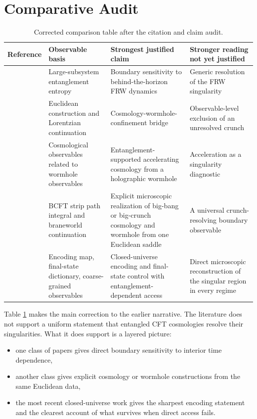 \documentclass[11pt]{article}
\begin{document}
\section{Comparative Audit}

\begin{table}[t]
\centering
\small
\setlength{\tabcolsep}{4pt}
\begin{tabular}{p{2.3cm}p{3.0cm}p{4.0cm}p{4.0cm}}
\toprule
Reference & Observable basis & Strongest justified claim & Stronger reading not yet justified \\
\midrule
\cite{Cooper:2018cmb} & Large-subsystem entanglement entropy & Boundary sensitivity to behind-the-horizon FRW dynamics & Generic resolution of the FRW singularity \\
\cite{VanRaamsdonk:2021qgv} & Euclidean construction and Lorentzian continuation & Cosmology-wormhole-confinement bridge & Observable-level exclusion of an unresolved crunch \\
\cite{Antonini:2022ptt} & Cosmological observables related to wormhole observables & Entanglement-supported accelerating cosmology from a holographic wormhole & Acceleration as a singularity diagnostic \\
\cite{Antonini:2024magnetic} & BCFT strip path integral and braneworld continuation & Explicit microscopic realization of big-bang or big-crunch cosmology and wormhole from one Euclidean saddle & A universal crunch-resolving boundary observable \\
\cite{Rath:2025baby} & Encoding map, final-state dictionary, coarse-grained observables & Closed-universe encoding and final-state control with entanglement-dependent access & Direct microscopic reconstruction of the singular region in every regime \\
\bottomrule
\end{tabular}
\caption{Corrected comparison table after the citation and claim audit.}
\label{tab:audit}
\end{table}

Table \ref{tab:audit} makes the main correction to the earlier narrative. The literature does not support a uniform statement that entangled CFT cosmologies resolve their singularities. What it does support is a layered picture:
\begin{itemize}
\item one class of papers gives direct boundary sensitivity to interior time dependence,
\item another class gives explicit cosmology or wormhole constructions from the same Euclidean data,
\item the most recent closed-universe work gives the sharpest encoding statement and the clearest account of what survives when direct access fails.
\end{itemize}
\end{document}
